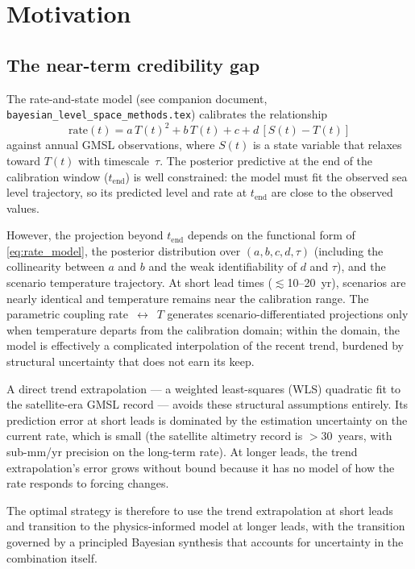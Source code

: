 \documentclass[11pt]{article}
\newcommand{\tend}{t_{\mathrm{end}}}
\begin{document}
\section{Motivation}

\subsection{The near-term credibility gap}

The rate-and-state model (see companion document, \texttt{bayesian\_level\_space\_methods.tex}) calibrates the relationship
\begin{equation}
  \mathrm{rate}(t) = a\,T(t)^2 + b\,T(t) + c + d\,[S(t) - T(t)]
  \label{eq:rate_model}
\end{equation}
against annual GMSL observations, where $S(t)$ is a state variable that relaxes toward $T(t)$ with timescale~$\tau$.  The posterior predictive at the end of the calibration window ($\tend$) is well constrained: the model must fit the observed sea level trajectory, so its predicted level and rate at $\tend$ are close to the observed values.

However, the projection beyond $\tend$ depends on the functional form of \cref{eq:rate_model}, the posterior distribution over $(a, b, c, d, \tau)$ (including the collinearity between $a$ and $b$ and the weak identifiability of $d$ and $\tau$), and the scenario temperature trajectory.  At short lead times ($\lesssim$10--20~yr), scenarios are nearly identical and temperature remains near the calibration range.  The parametric coupling rate~$\leftrightarrow$~$T$ generates scenario-differentiated projections only when temperature departs from the calibration domain; within the domain, the model is effectively a complicated interpolation of the recent trend, burdened by structural uncertainty that does not earn its keep.

A direct trend extrapolation --- a weighted least-squares (WLS) quadratic fit to the satellite-era GMSL record --- avoids these structural assumptions entirely.  Its prediction error at short leads is dominated by the estimation uncertainty on the current rate, which is small (the satellite altimetry record is $>$30~years, with sub-mm/yr precision on the long-term rate).  At longer leads, the trend extrapolation's error grows without bound because it has no model of how the rate responds to forcing changes.

The optimal strategy is therefore to use the trend extrapolation at short leads and transition to the physics-informed model at longer leads, with the transition governed by a principled Bayesian synthesis that accounts for uncertainty in the combination itself.
\end{document}

